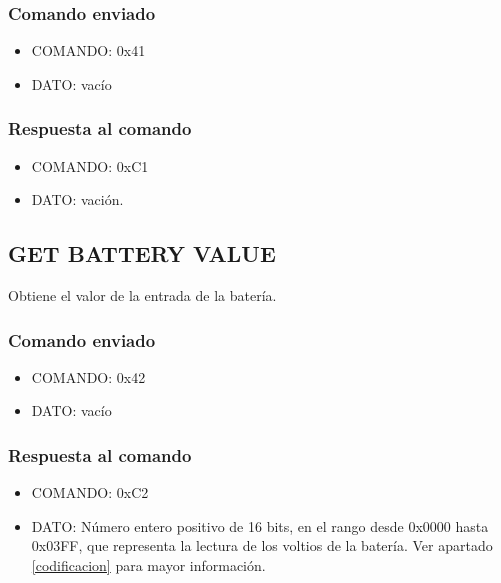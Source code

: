\documentclass[a4paper,10pt]{article}
\begin{document}
\subsubsection*{Comando enviado}

\begin{itemize}
	\item{COMANDO:} 0x41
	\item{DATO:} vac\'io
\end{itemize}

\subsubsection*{Respuesta al comando}

\begin{itemize}
	\item{COMANDO:} 0xC1
	\item{DATO:} vaci\'on.

\end{itemize}

\subsection{GET BATTERY VALUE}
\label{get_battery_value}

Obtiene el valor de la entrada de la bater\'ia.

\subsubsection*{Comando enviado}

\begin{itemize}
	\item{COMANDO:} 0x42
	\item{DATO:} vac\'io
\end{itemize}

\subsubsection*{Respuesta al comando}

\begin{itemize}
	\item{COMANDO:} 0xC2
	\item{DATO:} N\'umero entero positivo de 16 bits, en el rango desde 0x0000 hasta 0x03FF, que representa la lectura de los voltios de la bater\'ia.
		Ver apartado \ref{codificacion} para mayor informaci\'on.

\end{itemize}
\end{document}
